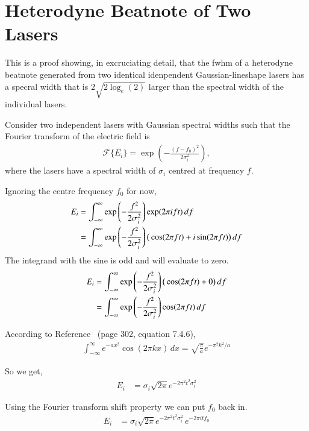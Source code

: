 \chapter{Heterodyne Beatnote of Two Lasers}

This is a proof showing, in excruciating detail, that the \gls{fwhm} of a heterodyne beatnote generated from two identical idenpendent Gaussian-lineshape lasers has  a specral width that is $2\sqrt{2\log_e(2)}$ larger than the spectral width of the individual lasers.

Consider two independent lasers with Gaussian spectral widths such that the Fourier transform of the electric field is
\begin{align}
\mathcal{F}\{E_i\} = \exp\left(-\frac{(f-f_0)^2}{2\sigma_i^2}\right),
\end{align}
where the lasers have a spectral width of $\sigma_i$ centred at frequency $f$.

Ignoring the centre frequency $f_0$ for now,
\begin{align}
E_i &= \int_{-\infty}^{\infty} \exp\left(-\frac{f^2}{2\sigma_i^2}\right) \exp(2\pi i f t) \,df\notag\\
&= \int_{-\infty}^{\infty} \exp\left(-\frac{f^2}{2\sigma_i^2}\right) \big(\cos(2\pi f t) + i\sin(2\pi f t)\big) \,df
\end{align}
The integrand with the sine is odd and will evaluate to zero.
\begin{align}
E_i &= \int_{-\infty}^{\infty} \exp\left(-\frac{f^2}{2\sigma_i^2}\right) \big(\cos(2\pi f t) + 0\big) \,df \notag\\
&= \int_{-\infty}^{\infty} \exp\left(-\frac{f^2}{2\sigma_i^2}\right)\cos(2\pi f t) \,df
\end{align}

According to Reference~\cite{abramowitz_handbook_2012} (page 302, equation 7.4.6),
\begin{align}
\int_{-\infty}^{\infty}e^{-ax^2}\cos(2\pi k x)\,dx = \sqrt{\frac{\pi}{a}} e^{-\pi^2k^2/a}
\end{align}

So we get,
\begin{align}
E_i &= \sigma_i\sqrt{2 \pi} e^{-2 \pi^2t^2 \sigma_i^2}
\end{align}

Using the Fourier transform shift property we can put $f_0$ back in.
\begin{align}
E_i &= \sigma_i\sqrt{2 \pi} e^{-2 \pi^2t^2 \sigma_i^2}\,e^{-2\pi i t f_0}
\end{align}


